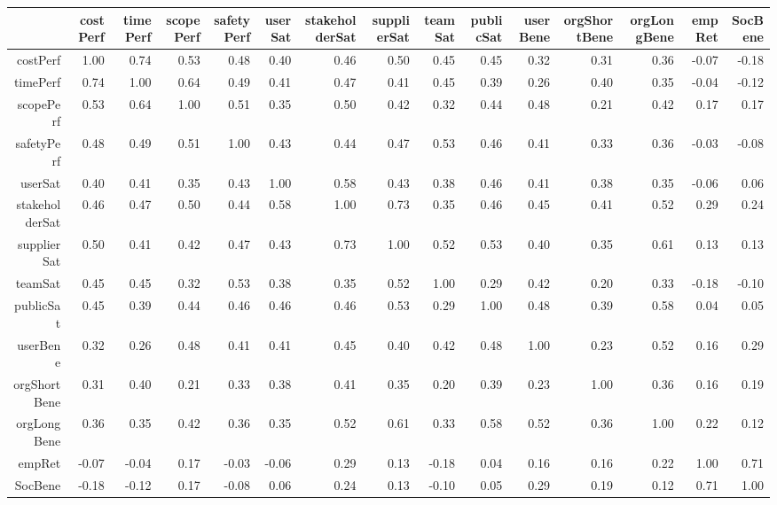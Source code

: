 \begin{table}[ht]
\centering
\begin{tabular}{rrrrrrrrrrrrrrr}
  \hline
 & costPerf & timePerf & scopePerf & safetyPerf & userSat & stakeholderSat & supplierSat & teamSat & publicSat & userBene & orgShortBene & orgLongBene & empRet & SocBene \\ 
  \hline
costPerf & 1.00 & 0.74 & 0.53 & 0.48 & 0.40 & 0.46 & 0.50 & 0.45 & 0.45 & 0.32 & 0.31 & 0.36 & -0.07 & -0.18 \\ 
  timePerf & 0.74 & 1.00 & 0.64 & 0.49 & 0.41 & 0.47 & 0.41 & 0.45 & 0.39 & 0.26 & 0.40 & 0.35 & -0.04 & -0.12 \\ 
  scopePerf & 0.53 & 0.64 & 1.00 & 0.51 & 0.35 & 0.50 & 0.42 & 0.32 & 0.44 & 0.48 & 0.21 & 0.42 & 0.17 & 0.17 \\ 
  safetyPerf & 0.48 & 0.49 & 0.51 & 1.00 & 0.43 & 0.44 & 0.47 & 0.53 & 0.46 & 0.41 & 0.33 & 0.36 & -0.03 & -0.08 \\ 
  userSat & 0.40 & 0.41 & 0.35 & 0.43 & 1.00 & 0.58 & 0.43 & 0.38 & 0.46 & 0.41 & 0.38 & 0.35 & -0.06 & 0.06 \\ 
  stakeholderSat & 0.46 & 0.47 & 0.50 & 0.44 & 0.58 & 1.00 & 0.73 & 0.35 & 0.46 & 0.45 & 0.41 & 0.52 & 0.29 & 0.24 \\ 
  supplierSat & 0.50 & 0.41 & 0.42 & 0.47 & 0.43 & 0.73 & 1.00 & 0.52 & 0.53 & 0.40 & 0.35 & 0.61 & 0.13 & 0.13 \\ 
  teamSat & 0.45 & 0.45 & 0.32 & 0.53 & 0.38 & 0.35 & 0.52 & 1.00 & 0.29 & 0.42 & 0.20 & 0.33 & -0.18 & -0.10 \\ 
  publicSat & 0.45 & 0.39 & 0.44 & 0.46 & 0.46 & 0.46 & 0.53 & 0.29 & 1.00 & 0.48 & 0.39 & 0.58 & 0.04 & 0.05 \\ 
  userBene & 0.32 & 0.26 & 0.48 & 0.41 & 0.41 & 0.45 & 0.40 & 0.42 & 0.48 & 1.00 & 0.23 & 0.52 & 0.16 & 0.29 \\ 
  orgShortBene & 0.31 & 0.40 & 0.21 & 0.33 & 0.38 & 0.41 & 0.35 & 0.20 & 0.39 & 0.23 & 1.00 & 0.36 & 0.16 & 0.19 \\ 
  orgLongBene & 0.36 & 0.35 & 0.42 & 0.36 & 0.35 & 0.52 & 0.61 & 0.33 & 0.58 & 0.52 & 0.36 & 1.00 & 0.22 & 0.12 \\ 
  empRet & -0.07 & -0.04 & 0.17 & -0.03 & -0.06 & 0.29 & 0.13 & -0.18 & 0.04 & 0.16 & 0.16 & 0.22 & 1.00 & 0.71 \\ 
  SocBene & -0.18 & -0.12 & 0.17 & -0.08 & 0.06 & 0.24 & 0.13 & -0.10 & 0.05 & 0.29 & 0.19 & 0.12 & 0.71 & 1.00 \\ 
   \hline
\end{tabular}
\end{table}
